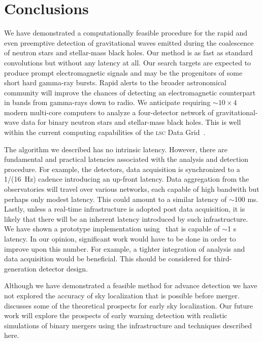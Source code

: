 \section{Conclusions}
\label{SECV}\label{sec:conclusions}

%
We have demonstrated a computationally feasible procedure for the rapid and even preemptive
detection of gravitational waves emitted during the coalescence of neutron
stars and stellar-mass black holes. Our method is as fast as standard \fft{}
convolutions but without any latency at all. Our search targets are expected to
produce prompt electromagnetic signals and may be the progenitors of some short
hard gamma-ray bursts.  Rapid alerts to the broader astronomical community will
improve the chances of detecting an electromagnetic counterpart in bands from
gamma-rays down to radio.  We anticipate requiring $\sim10\times4$ modern
multi-core computers to analyze a four-detector network of gravitational-wave data
for binary neutron stars and stellar-mass black holes.  This is well within the
current computing capabilities of the \textsc{lsc} Data Grid~\cite{LDG}.

The algorithm we described has no intrinsic latency.  However, there are
fundamental and practical latencies associated with the analysis and detection
procedure. For example, the \LIGO{} detectors, data acquisition is synchronized
to a 1/(16~Hz) cadence introducing an up-front latency.  Data
aggregation from the observatories will travel over various networks, each
capable of high bandwith but perhaps only modest latency.  This could amount to
a similar latency of $\sim$100 ms.  Lastly, unless a real-time infrastructure is
adopted post data acquisition, it is likely that there will be an inherent
latency introduced by such infrastructure.  We have shown a prototype
implementation using \gstlal\ that is capable of $\sim$1 s latency. In our
opinion, significant work would have to be done in order to improve upon this
number. For example, a tighter integration of analysis and data acquisition
would be beneficial. This should be considered for third-generation detector
design.

Although we have demonstrated a feasible method for advance detection we have
not explored the accuracy of sky localization that is possible before merger.
~\cite{Fairhurst2009} discusses some of the theoretical prospects for early sky
localization.  Our future work will explore the prospects of early warning
detection with realistic simulations of binary mergers using the infrastructure
and techniques described here. 

